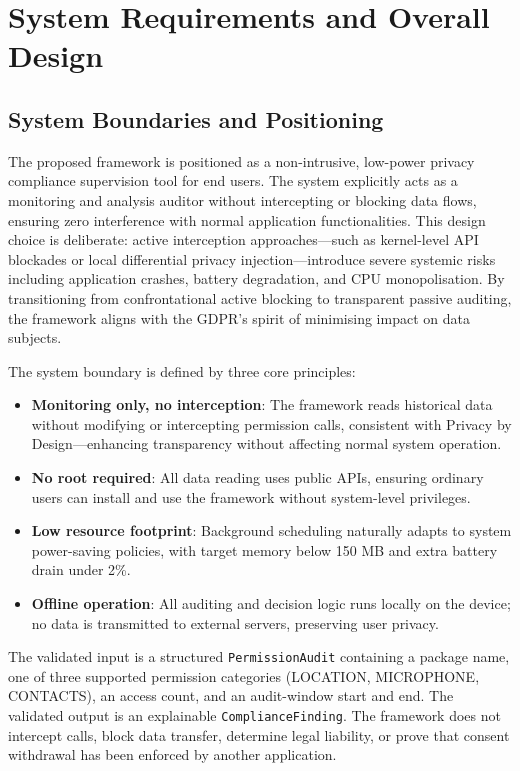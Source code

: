 \newpage
\section{System Requirements and Overall Design}

\subsection{System Boundaries and Positioning}

The proposed framework is positioned as a non-intrusive, low-power privacy compliance supervision tool for end users. The system explicitly acts as a monitoring and analysis auditor without intercepting or blocking data flows, ensuring zero interference with normal application functionalities. This design choice is deliberate: active interception approaches—such as kernel-level API blockades or local differential privacy injection—introduce severe systemic risks including application crashes, battery degradation, and CPU monopolisation. By transitioning from confrontational active blocking to transparent passive auditing, the framework aligns with the GDPR's spirit of minimising impact on data subjects.

The system boundary is defined by three core principles:

\begin{itemize}
\item \textbf{Monitoring only, no interception}: The framework reads historical data without modifying or intercepting permission calls, consistent with Privacy by Design—enhancing transparency without affecting normal system operation.
\item \textbf{No root required}: All data reading uses public APIs, ensuring ordinary users can install and use the framework without system-level privileges.
\item \textbf{Low resource footprint}: Background scheduling naturally adapts to system power-saving policies, with target memory below 150 MB and extra battery drain under 2\%.
\item \textbf{Offline operation}: All auditing and decision logic runs locally on the device; no data is transmitted to external servers, preserving user privacy.
\end{itemize}

The validated input is a structured \texttt{PermissionAudit} containing a package name, one of three supported permission categories (LOCATION, MICROPHONE, CONTACTS), an access count, and an audit-window start and end. The validated output is an explainable \texttt{ComplianceFinding}. The framework does not intercept calls, block data transfer, determine legal liability, or prove that consent withdrawal has been enforced by another application.

